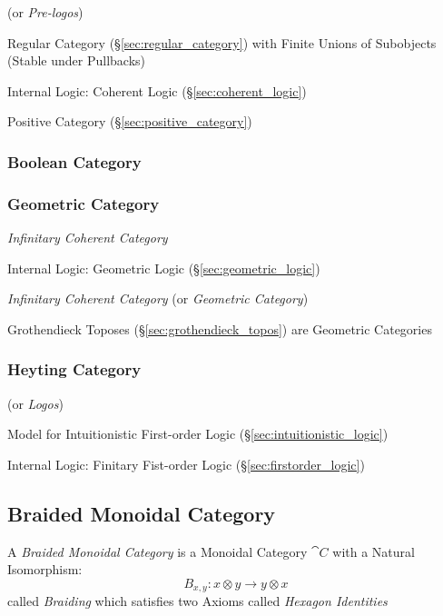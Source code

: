 (or \emph{Pre-logos})

Regular Category (\S\ref{sec:regular_category}) with Finite Unions of
Subobjects (Stable under Pullbacks)

Internal Logic: Coherent Logic (\S\ref{sec:coherent_logic})

Positive Category (\S\ref{sec:positive_category})



\subsubsection{Boolean Category}\label{sec:boolean_category}

\subsubsection{Geometric Category}\label{sec:geometric_category}

\emph{Infinitary Coherent Category}

Internal Logic: Geometric Logic (\S\ref{sec:geometric_logic})

\emph{Infinitary Coherent Category} (or \emph{Geometric Category})

Grothendieck Toposes (\S\ref{sec:grothendieck_topos}) are Geometric
Categories



\subsubsection{Heyting Category}\label{sec:heyting_category}

(or \emph{Logos})

Model for Intuitionistic First-order Logic
(\S\ref{sec:intuitionistic_logic})

Internal Logic: Finitary Fist-order Logic
(\S\ref{sec:firstorder_logic})



\subsection{Braided Monoidal Category}\label{sec:braided_monoidal}

A \emph{Braided Monoidal Category} is a Monoidal Category $\cat{C}$ with a
Natural Isomorphism:
\[
  B_{x,y} : x \otimes y \rightarrow y \otimes x
\]
called \emph{Braiding} which satisfies two Axioms called \emph{Hexagon
  Identities} %

